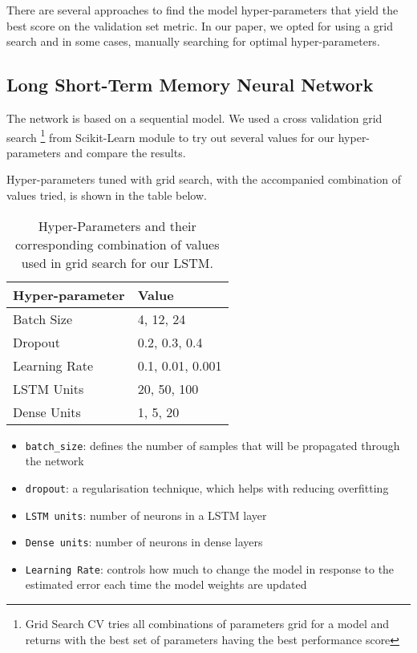 There are several approaches to find the model hyper-parameters that yield the best score on the validation set metric. In our paper, we opted for using a grid search and in some cases,  manually searching for optimal hyper-parameters. 

\subsection{Long Short-Term Memory Neural Network}

The network is based on a sequential model. We used a cross validation grid search \footnote{Grid Search CV tries all combinations of parameters grid for a model and returns with the best set of parameters having the best performance score} from Scikit-Learn module to try out several values for our hyper-parameters and compare the results. 

Hyper-parameters tuned with grid search, with the accompanied combination of values tried, is shown in the table below.

\begin{table}[h]
\centering
\begin{tabular}{ll}
\hline
Hyper-parameter     &  Value \\
\hline
Batch Size      & 4, 12, 24 \\
Dropout & 0.2, 0.3, 0.4 \\
Learning Rate & 0.1, 0.01, 0.001 \\
LSTM Units & 20, 50, 100 \\
Dense Units & 1, 5, 20\\
\hline
\end{tabular}
\caption{Hyper-Parameters and their corresponding combination of values used in grid search for our LSTM.}
\end{table}

\begin{itemize}
\item  \verb|batch_size|: defines the number of samples that will be propagated through the network
\item  \verb|dropout|: a regularisation technique, which helps with reducing overfitting
\item  \verb|LSTM units|:  number of neurons in a LSTM layer
\item  \verb|Dense units|:  number of neurons in dense layers
\item \verb|Learning Rate|: controls how much to change the model in response to the estimated error each time the model weights are updated
\end{itemize}

